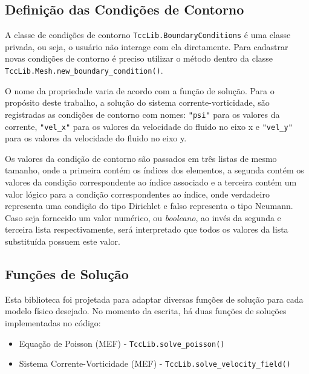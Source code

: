 \subsection{\textbf{Definição das Condições de Contorno}}
A classe de condições de contorno \verb|TccLib.BoundaryConditions| é uma classe privada, ou seja, o usuário não interage com ela diretamente.
Para cadastrar novas condições de contorno é preciso utilizar o método dentro da classe \verb|TccLib.Mesh.new_boundary_condition()|.

O nome da propriedade varia de acordo com a função de solução.
Para o propósito deste trabalho, a solução do sistema corrente-vorticidade, são registradas as condições de contorno com nomes: \verb|"psi"| para os valores da corrente, \verb|"vel_x"| para os valores da velocidade do fluido no eixo x e  \verb|"vel_y"| para os valores da velocidade do fluido no eixo y.

Os valores da condição de contorno são passados em três listas de mesmo tamanho, onde a primeira contém os índices dos elementos, a segunda contém os valores da condição correspondente ao índice associado e a terceira contém um valor lógico para a condição correspondentes ao índice, onde verdadeiro representa uma condição do tipo Dirichlet e falso representa o tipo Neumann.
Caso seja fornecido um valor numérico, ou \textit{booleano}, ao invés da segunda e terceira lista respectivamente, será interpretado que todos os valores da lista substituída possuem este valor.

\subsection{\textbf{Funções de Solução}}
Esta biblioteca foi projetada para adaptar diversas funções de solução para cada modelo físico desejado.
No momento da escrita, há duas funções de soluções implementadas no código:
\begin{itemize}
    \item Equação de Poisson (MEF) - \verb|TccLib.solve_poisson()|
    \item Sistema Corrente-Vorticidade (MEF) - \verb|TccLib.solve_velocity_field()|
\end{itemize}

